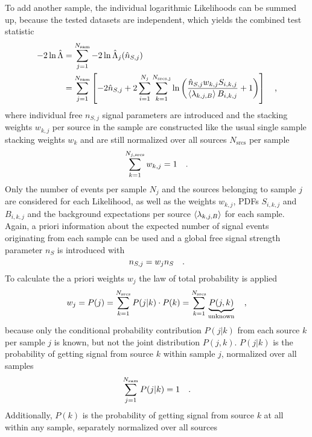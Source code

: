 To add another sample, the individual logarithmic Likelihoods can be summed up, because the tested datasets are independent, which yields the combined test statistic
\begin{align}
  -2\ln\hat{\Lambda}
  &= \sum_{j=1}^{N_\text{sam}} -2\ln\hat{\Lambda}_j(\hat{n}_{S,j}) \\
  &= \sum_{j=1}^{N_\text{sam}} \left[
        -2\hat{n}_{S,j} +
        2\sum_{i=1}^{N_j} \sum_{k=1}^{N_\text{srcs,j}} \ln\left(
          \frac{\hat{n}_{S,j} w_{k,j} S_{i,k,j}}
               {\Braket{\lambda_{k,j,B}} B_{i,k,j}}
          + 1
        \right)
      \right]
  \quad\text{,}
\end{align}
where individual free $n_{S,j}$ signal parameters are introduced and the stacking weights $w_{k,j}$ per source in the sample are constructed like the usual single sample stacking weights $w_k$ and are still normalized over all sources $N_\text{srcs}$ per sample
\begin{equation}
  \sum_{k=1}^{N_{j,\text{srcs}}} w_{k,j} = 1
  \quad\text{.}
\end{equation}
Only the number of events per sample $N_j$ and the sources belonging to sample $j$ are considered for each Likelihood, as well as the weights $w_{k,j}$, PDFs $S_{i,k,j}$ and $B_{i,k,j}$ and the background expectations per source $\Braket{\lambda_{k,j,B}}$ for each sample.
Again, a priori information about the expected number of signal events originating from each sample can be used and a global free signal strength parameter $n_S$ is introduced with
\begin{equation}
  n_{S,j} = w_j n_S
  \quad\text{.}
\end{equation}
To calculate the a priori weights $w_j$ the law of total probability is applied
\begin{equation}
  w_j = P(j) = \sum_{k=1}^{N_\text{srcs}} P(j|k)\cdot P(k)
  = \sum_{k=1}^{N_\text{srcs}} \underbrace{P(j,k)}_\text{unknown}
  \quad\text{,}
\end{equation}
because only the conditional probability contribution $P(j|k)$ from each source $k$ per sample $j$ is known, but not the joint distribution $P(j,k)$.
$P(j|k)$ is the probability of getting signal from source $k$ within sample $j$, normalized over all samples
\begin{equation}
  \sum_{j=1}^{N_\text{sam}} P(j|k) = 1
  \quad\text{.}
\end{equation}
Additionally, $P(k)$ is the probability of getting signal from source $k$ at all within any sample, separately normalized over all sources
